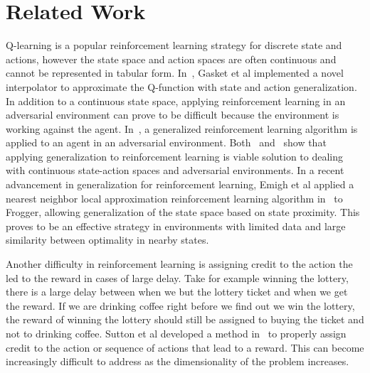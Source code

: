 \section{Related Work}

Q-learning is a popular reinforcement learning strategy for discrete state and actions, however the state space and action spaces are often continuous and cannot be represented in tabular form. In~\cite{gaskett}, Gasket et al implemented a novel interpolator to approximate the Q-function with state and action generalization. In addition to a continuous state space, applying reinforcement learning in an adversarial environment can prove to be difficult because the environment is working against the agent. In~\cite{uther}, a generalized reinforcement learning algorithm is applied to an agent in an adversarial environment. Both~\cite{gaskett} and~\cite{uther} show that applying generalization to reinforcement learning is viable solution to dealing with continuous state-action spaces and adversarial environments. In a recent advancement in generalization for reinforcement learning, Emigh et al applied a nearest neighbor local approximation reinforcement learning algorithm in~\cite{emigh} to Frogger, allowing generalization of the state space based on state proximity. This proves to be an effective strategy in environments with limited data and large similarity between optimality in nearby states.

Another difficulty in reinforcement learning is assigning credit to the action the led to the reward in cases of large delay. Take for example winning the lottery, there is a large delay between when we but the lottery ticket and when we get the reward. If we are drinking coffee right before we find out we win the lottery, the reward of winning the lottery should still be assigned to buying the ticket and not to drinking coffee. Sutton et al developed a method in~\cite{sutton} to properly assign credit to the action or sequence of actions that lead to a reward. This can become increasingly difficult to address as the dimensionality of the problem increases.       
